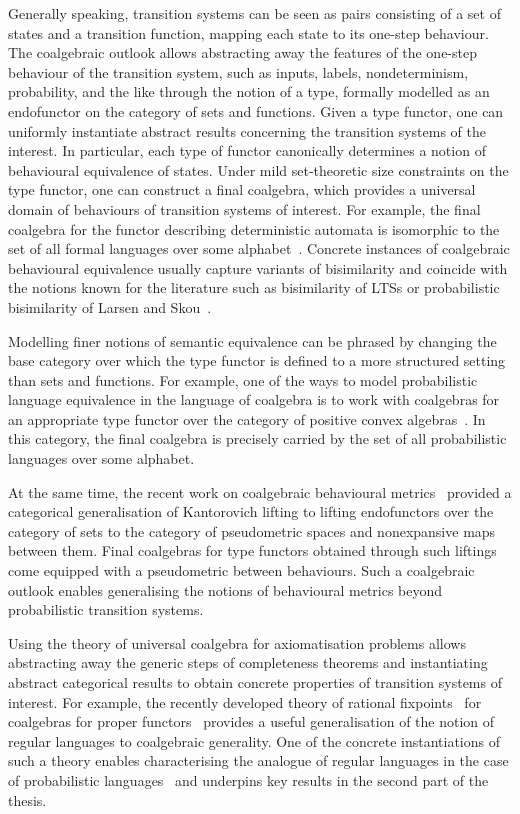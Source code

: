 Generally speaking, transition systems can be seen as pairs consisting of a set of states and a transition function, mapping each state to its one-step behaviour. The coalgebraic outlook allows abstracting away the features of the one-step behaviour of the transition system, such as inputs, labels, nondeterminism, probability, and the like through the notion of a type, formally modelled as an endofunctor on the category of sets and functions. Given a type functor, one can uniformly instantiate abstract results concerning the transition systems of the interest. In particular, each type of functor canonically determines a notion of behavioural equivalence of states. Under mild set-theoretic size constraints on the type functor, one can construct a final coalgebra, which provides a universal domain of behaviours of transition systems of interest. For example, the final coalgebra for the functor describing deterministic automata is isomorphic to the set of all formal languages over some alphabet~\cite{Rutten:2000:Universal}. Concrete instances of coalgebraic behavioural equivalence usually capture variants of bisimilarity and coincide with the notions known for the literature such as bisimilarity of LTSs or probabilistic bisimilarity of Larsen and Skou~\cite{Vink:1999:Bisimulation}.  
		
	Modelling finer notions of semantic equivalence can be phrased by changing the base category over which the type functor is defined to a more structured setting than sets and functions. For example, one of the ways to model probabilistic language equivalence in the language of coalgebra is to work with coalgebras for an appropriate type functor over the category of positive convex algebras~\cite{Silva:2010:Generalizing,Silva:2011:Sound}. In this category, the final coalgebra is precisely carried by the set of all probabilistic languages over some alphabet. 	 

At the same time, the recent work on coalgebraic behavioural metrics~\cite{Baldan:2018:Coalgebraic} provided a categorical generalisation of Kantorovich lifting to lifting endofunctors over the category of sets to the category of pseudometric spaces and nonexpansive maps between them. Final coalgebras for type functors obtained through such liftings come equipped with a pseudometric between behaviours. Such a coalgebraic outlook enables generalising the notions of behavioural metrics beyond probabilistic transition systems. 

Using the theory of universal coalgebra for axiomatisation problems allows abstracting away the generic steps of completeness theorems and instantiating abstract categorical results to obtain concrete properties of transition systems of interest. For example, the recently developed theory of rational fixpoints~\cite{Milius:2010:Sound} for coalgebras for proper functors~\cite{Milius:2018:Proper} provides a useful generalisation of the notion of regular languages to coalgebraic generality. One of the concrete instantiations of such a theory enables characterising the analogue of regular languages in the case of probabilistic languages~\cite{Sokolova:2018:Proper} and underpins key results in the second part of the thesis.


